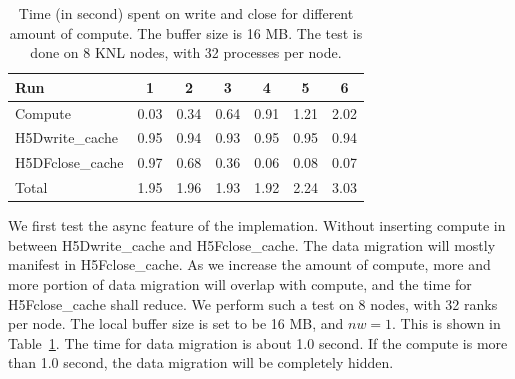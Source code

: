\documentclass[aps, rmp, 11pt, notitlepage]{revtex4-1}
\begin{document}
\begin{table}[hbt]
\centering
\caption{Time (in second) spent on write and close for different amount of compute. The buffer size is 16 MB. The test is done on 8 KNL nodes, with 32 processes per node. }\label{tab:async}
\begin{tabular}{l||cccccc}
\hline
Run & 1 & 2 & 3 & 4 & 5 & 6 \\
\hline
\hline
Compute     & 0.03 &  0.34 & 0.64 & 0.91 & 1.21  & 2.02\\
H5Dwrite\_cache &  0.95 & 0.94 & 0.93 &  0.95 & 0.95  & 0.94 \\
H5DFclose\_cache & 0.97  & 0.68 & 0.36 & 0.06 & 0.08 & 0.07\\ 
\hline
\hline
Total & 1.95  & 1.96 & 1.93 & 1.92 & 2.24 & 3.03 \\
\hline
\end{tabular}
\end{table}
We first test the async feature of the implemation. Without inserting compute in between H5Dwrite\_cache and H5Fclose\_cache. The data migration will mostly manifest in H5Fclose\_cache. As we increase the amount of compute, more and more portion of data migration will overlap with compute, and the time for H5Fclose\_cache shall reduce. We perform such a test on 8 nodes, with 32 ranks per node. The local buffer size is set to be 16 MB, and $nw=1$. This is shown in Table~\ref{tab:async}. The time for data migration is about 1.0 second. If the compute is more than 1.0 second, the data migration will be completely hidden. 
\end{document}
